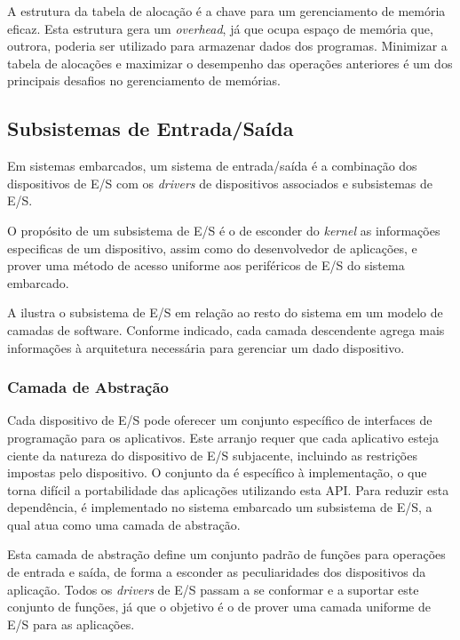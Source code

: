 A estrutura da tabela de alocação é a chave para um gerenciamento de memória eficaz. Esta estrutura gera um \emph{overhead}, já que ocupa espaço de memória que, outrora, poderia ser utilizado para armazenar dados dos programas. Minimizar a tabela de alocações e maximizar o desempenho das operações anteriores é um dos principais desafios no gerenciamento de memórias.

\subsection{Subsistemas de Entrada/Saída}

Em sistemas embarcados, um sistema de entrada/saída é a combinação dos dispositivos de E/S com os \emph{drivers} de dispositivos associados e subsistemas de E/S.

O propósito de um subsistema de E/S é o de esconder do \emph{kernel} as informações especificas de um dispositivo, assim como do desenvolvedor de aplicações, e prover uma método de acesso uniforme aos periféricos de E/S do sistema embarcado.

A  ilustra o subsistema de E/S em relação ao resto do sistema em um modelo de camadas de software. Conforme indicado, cada camada descendente agrega mais informações à arquitetura necessária para gerenciar um dado dispositivo.


\subsubsection{Camada de Abstração}

Cada dispositivo de E/S pode oferecer um conjunto específico de interfaces de programação para os aplicativos. Este arranjo requer que cada aplicativo esteja ciente da natureza do dispositivo de E/S subjacente, incluindo as restrições impostas pelo dispositivo. O conjunto da  é específico à implementação, o que torna difícil a portabilidade das aplicações utilizando esta API. Para reduzir esta dependência, é implementado no sistema embarcado um subsistema de E/S, a qual atua como uma camada de abstração.

Esta camada de abstração define um conjunto padrão de funções para operações de entrada e saída, de forma a esconder as peculiaridades dos dispositivos da aplicação. Todos os \emph{drivers} de E/S passam a se conformar e a suportar este conjunto de funções, já que o objetivo é o de prover uma camada uniforme de E/S para as aplicações. 

